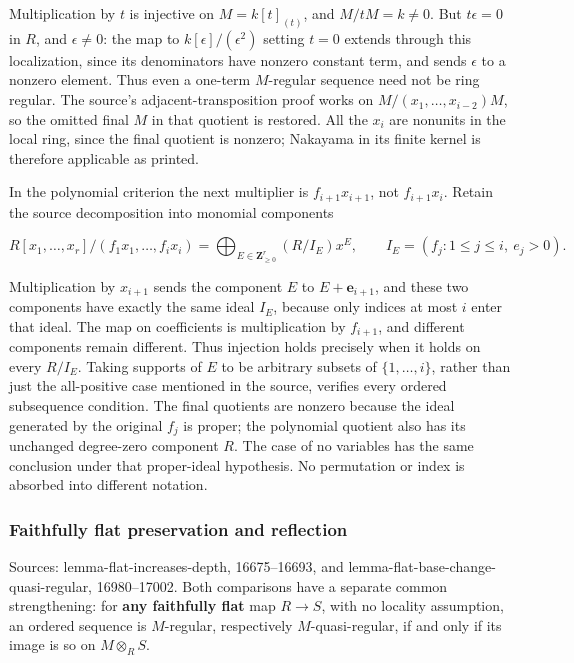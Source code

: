 Multiplication by \(t\) is injective on \(M=k[t]_{(t)}\), and \(M/tM=k\ne0\). But \(t\epsilon=0\) in \(R\), and \(\epsilon\ne0\): the map to \(k[\epsilon]/(\epsilon^2)\) setting \(t=0\) extends through this localization, since its denominators have nonzero constant term, and sends \(\epsilon\) to a nonzero element. Thus even a one-term \(M\)-regular sequence need not be ring regular. The source's adjacent-transposition proof works on \(M/(x_1,\ldots,x_{i-2})M\), so the omitted final \(M\) in that quotient is restored. All the \(x_i\) are nonunits in the local ring, since the final quotient is nonzero; Nakayama in its finite kernel is therefore applicable as printed.

In the polynomial criterion the next multiplier is \(f_{i+1}x_{i+1}\), not \(f_{i+1}x_i\). Retain the source decomposition into monomial components

\[
R[x_1,\ldots,x_r]/(f_1x_1,\ldots,f_ix_i)
=\bigoplus_{E\in\mathbf Z_{\geq0}^r}(R/I_E)x^E,
\qquad I_E=(f_j:1\leq j\leq i,\ e_j>0).
\]

Multiplication by \(x_{i+1}\) sends the component \(E\) to \(E+\mathbf e_{i+1}\), and these two components have exactly the same ideal \(I_E\), because only indices at most \(i\) enter that ideal. The map on coefficients is multiplication by \(f_{i+1}\), and different components remain different. Thus injection holds precisely when it holds on every \(R/I_E\). Taking supports of \(E\) to be arbitrary subsets of \(\{1,\ldots,i\}\), rather than just the all-positive case mentioned in the source, verifies every ordered subsequence condition. The final quotients are nonzero because the ideal generated by the original \(f_j\) is proper; the polynomial quotient also has its unchanged degree-zero component \(R\). The case of no variables has the same conclusion under that proper-ideal hypothesis. No permutation or index is absorbed into different notation.

\subsubsection{Faithfully flat preservation and reflection}\label{algebra-proof-006-faithfully-flat-preservation-and-reflection}

Sources: lemma-\AlgebraIdentifierBreak{}flat-\AlgebraIdentifierBreak{}increases-\AlgebraIdentifierBreak{}depth, 16675--16693, and lemma-\AlgebraIdentifierBreak{}flat-\AlgebraIdentifierBreak{}base-\AlgebraIdentifierBreak{}change-\AlgebraIdentifierBreak{}quasi-\AlgebraIdentifierBreak{}regular, 16980--17002. Both comparisons have a separate common strengthening: for \textbf{any faithfully flat} map \(R\to S\), with no locality assumption, an ordered sequence is \(M\)-regular, respectively \(M\)-quasi-regular, if and only if its image is so on \(M\otimes_RS\).

